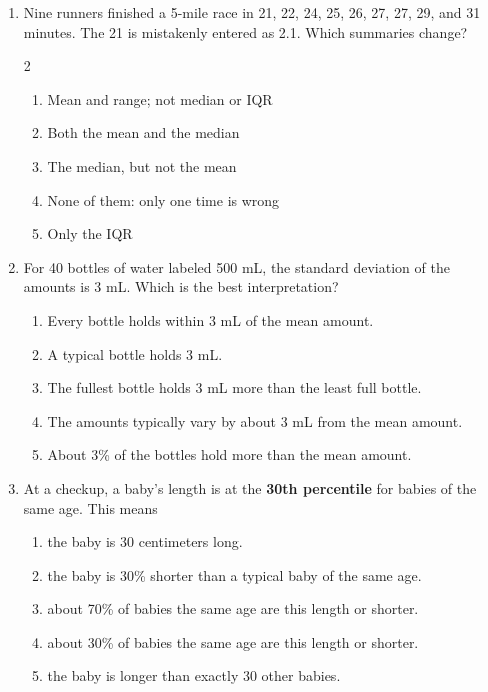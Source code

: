 \documentclass[12pt]{article}
\newenvironment{choices}
  {\begin{enumerate}[label=\textbf{(\Alph*)}, leftmargin=2.2em, itemsep=0pt, topsep=1pt]}
  {\end{enumerate}}
\newcommand{\letterroom}{\rule[-15pt]{0pt}{36pt}}
\begin{document}
\begin{enumerate}[leftmargin=1.9em, itemsep=0.03in]
  \boxguard[10]
  \item Nine runners finished a 5-mile race in 21, 22, 24, 25, 26, 27, 27, 29, and 31 minutes. The
        21 is mistakenly entered as 2.1. Which summaries change?
        \begin{multicols}{2}
        \begin{choices}
          \item Mean and range; not median or IQR
          \item Both the mean and the median
          \item The median, but not the mean
          \item None of them: only one time is wrong
          \item Only the IQR
                \hfill{}\letterroom
        \end{choices}
        \end{multicols}

  \boxguard[10]
  \item For 40 bottles of water labeled 500 mL, the standard deviation of the amounts is 3 mL.
        Which is the best interpretation?
        \begin{choices}
          \item Every bottle holds within 3 mL of the mean amount.
          \item A typical bottle holds 3 mL.
          \item The fullest bottle holds 3 mL more than the least full bottle.
          \item The amounts typically vary by about 3 mL from the mean amount.
          \item About 3\% of the bottles hold more than the mean amount.
                \hfill{}\letterroom
        \end{choices}

  \boxguard[10]
  \item At a checkup, a baby's length is at the \textbf{30th percentile} for babies of the same
        age. This means
        \begin{choices}
          \item the baby is 30 centimeters long.
          \item the baby is 30\% shorter than a typical baby of the same age.
          \item about 70\% of babies the same age are this length or shorter.
          \item about 30\% of babies the same age are this length or shorter.
          \item the baby is longer than exactly 30 other babies.
                \hfill{}\letterroom
        \end{choices}


\end{enumerate}
\end{document}
